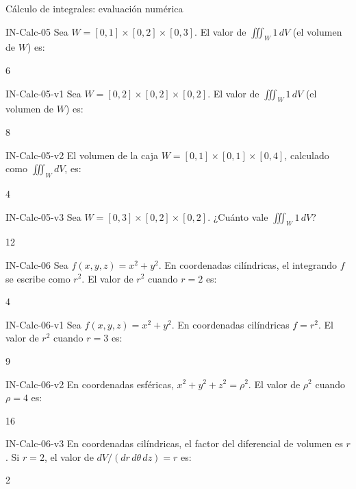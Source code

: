 \documentclass[a4,11pt]{aleph-notas}
\begin{document}
\begin{quiz}{Cálculo de integrales: evaluación numérica}
\begin{numerical}[tolerance=0.01]%
    {IN-Calc-05}
    Sea $W = [0,1]\times[0,2]\times[0,3]$. El valor de $\displaystyle\iiint_W 1\,dV$ (el volumen de $W$) es:
    \item 6
\end{numerical}

\begin{numerical}[tolerance=0.01]%
    {IN-Calc-05-v1}
    Sea $W = [0,2]\times[0,2]\times[0,2]$. El valor de $\displaystyle\iiint_W 1\,dV$ (el volumen de $W$) es:
    \item 8
\end{numerical}

\begin{numerical}[tolerance=0.01]%
    {IN-Calc-05-v2}
    El volumen de la caja $W=[0,1]\times[0,1]\times[0,4]$, calculado como $\displaystyle\iiint_W dV$, es:
    \item 4
\end{numerical}

\begin{numerical}[tolerance=0.01]%
    {IN-Calc-05-v3}
    Sea $W = [0,3]\times[0,2]\times[0,2]$. ¿Cuánto vale $\displaystyle\iiint_W 1\,dV$?
    \item 12
\end{numerical}

\begin{numerical}[tolerance=0.01]%
    {IN-Calc-06}
    Sea $f(x,y,z) = x^2 + y^2$. En coordenadas cilíndricas, el integrando $f$ se escribe como $r^2$. El valor de $r^2$ cuando $r=2$ es:
    \item 4
\end{numerical}

\begin{numerical}[tolerance=0.01]%
    {IN-Calc-06-v1}
    Sea $f(x,y,z) = x^2 + y^2$. En coordenadas cilíndricas $f = r^2$. El valor de $r^2$ cuando $r=3$ es:
    \item 9
\end{numerical}

\begin{numerical}[tolerance=0.01]%
    {IN-Calc-06-v2}
    En coordenadas esféricas, $x^2+y^2+z^2 = \rho^2$. El valor de $\rho^2$ cuando $\rho=4$ es:
    \item 16
\end{numerical}

\begin{numerical}[tolerance=0.01]%
    {IN-Calc-06-v3}
    En coordenadas cilíndricas, el factor del diferencial de volumen es $r$. Si $r=2$, el valor de $dV/(dr\,d\theta\,dz)=r$ es:
    \item 2
\end{numerical}


\end{quiz}
\end{document}
